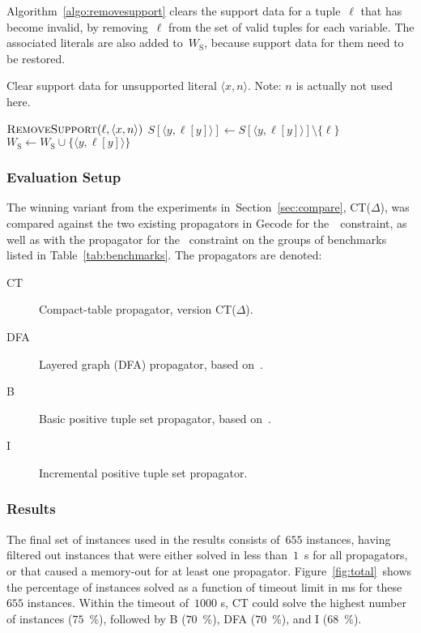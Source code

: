 \documentclass[a4paper,11pt]{article}
\theoremstyle{definition}
\newcommand{\Secref}[1]{Section~\ref{#1}}
\newcommand{\Algoref}[1]{Algorithm~\ref{#1}}
\newcommand{\Table}{\Constraint{Table}}
\newcommand{\Regular}{\Constraint{Regular}}
\newcommand{\FOREACH}[1]{\FORALL{{#1} \textbf{do}}}
\newcommand{\ENDFOREACH}{\ENDFOR}
\def\PROCEDURE{\item[\textbf{PROCEDURE}]}
\def\RemoveSupport{\textsc{Remove\-Support}}
\numberwithin{equation}{section}
\begin{document}
\begin{description}
\Algoref{algo:removesupport} clears the support data for a tuple~$\ell$ that has
become invalid, by removing~$\ell$ from the set of valid tuples for each variable.
The associated literals are also added to~$W_\text{S}$, because support data for them
need to be restored.

\begin{algorithm}
\caption{Clear support data for unsupported literal $\langle x,n
  \rangle$.  Note: $n$ is actually not used here.}
  \label{algo:removesupport}
\begin{algorithmic}[1]
  \PROCEDURE $\RemoveSupport(\ell, \langle x,n \rangle)$
  \FOREACH{$y \in X$}
    \STATE $S[\langle y,\ell[y] \rangle] \gets S[\langle y,\ell[y] \rangle] \setminus \{ \ell \}$
      \STATE $W_\text{S} \gets W_\text{S} \cup \{ \langle y,\ell[y] \rangle \}$
    \ENDIF
  \ENDFOREACH
\end{algorithmic}
\end{algorithm}

   \end{description}
\clearpage
\subsubsection{Evaluation Setup}
The winning variant from the experiments in~\Secref{sec:compare},
CT($\Delta$), was compared against the two existing propagators
in Gecode for the~\Table~constraint, as well as with the propagator
for the \Regular~constraint on the groups of benchmarks
listed in Table~\ref{tab:benchmarks}. The propagators are
denoted:

\begin{description}
  \item[CT] Compact-table propagator, version CT($\Delta$).
  \item[DFA] Layered graph (DFA) propagator, based on~\cite{Pesant:seqs}.
  \item[B] Basic positive tuple set propagator, based on~\cite{DBLP:journals/ai/BessiereRYZ05}.
  \item[I] Incremental positive tuple set propagator.
\end{description}

\subsubsection{Results}

The final set of instances used in the results consists of~$655$ instances,
having filtered out instances that were either solved in less than~$1$~s for all
propagators, or that caused a memory-out for at least one propagator.
Figure~\ref{fig:total}~shows the percentage of instances solved as a function
of timeout limit in ms for these~$655$ instances. Within the timeout of~$1000$ s,
CT could solve the highest number of instances ($75$~\%), followed by B ($70$~\%),
DFA ($70$~\%), and I ($68$~\%).
\end{document}
